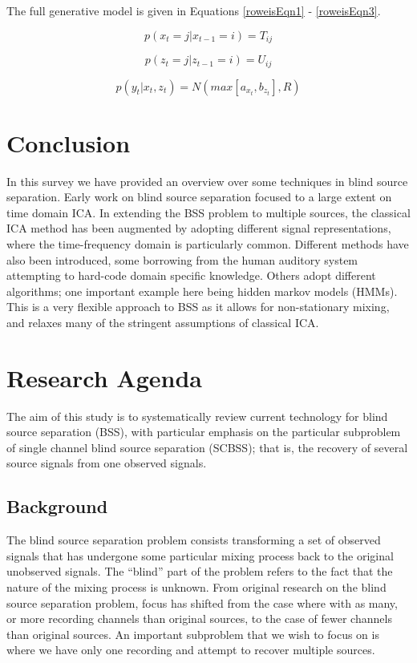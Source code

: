 \documentclass[11pt, oneside, a4paper]{report}
\begin{document}
The full generative model is given in Equations \ref{roweisEqn1} - \ref{roweisEqn3}.

\begin{equation}\label{roweisEqn1}
  p(x_{t}=j|x_{t-1}=i)=T_{ij}
\end{equation}

\begin{equation}\label{roweisEqn2}
  p(z_{t}=j|z_{t-1}=i)=U_{ij}  
\end{equation}

\begin{equation}\label{roweisEqn3}
  p(y_{t}|x_{t},z_{t})=N(max[a_{x_{t}},b_{z_{t}}], R)  
\end{equation}


\section{Conclusion}\label{conclusion}

In this survey we have provided an overview over some techniques in
blind source separation. Early work on blind source separation focused
to a large extent on time domain ICA. In extending the BSS problem to
multiple sources, the classical ICA method has been augmented by
adopting different signal representations, where the time-frequency
domain is particularly common. Different methods have also been
introduced, some borrowing from the human auditory system attempting
to hard-code domain specific knowledge. Others adopt different
algorithms; one important example here being hidden markov models
(HMMs). This is a very flexible approach to BSS as it allows for
non-stationary mixing, and relaxes many of the stringent assumptions
of classical ICA. 



\section{Research Agenda}\label{protocol}
The aim of this study is to systematically review current technology
for blind source separation (BSS), with particular emphasis on the
particular subproblem of single channel blind source separation
(SCBSS); that is, the recovery of several source signals from one observed signals.


\subsection{Background}
The blind source separation problem consists transforming a set of observed signals that has undergone some particular mixing process back to the original unobserved signals. The “blind” part of the problem refers to the fact that the nature of the mixing process is unknown. From original research on the blind source separation problem, focus has shifted from the case where with as many, or more recording channels than original sources, to the case of fewer channels than original sources. An important subproblem that we wish to focus on is where we have only one recording and attempt to recover multiple sources.
\end{document}

